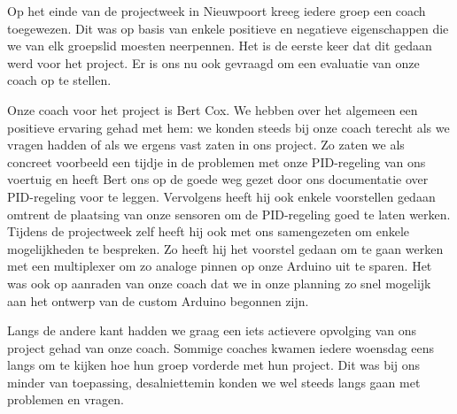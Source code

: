 Op het einde van de projectweek in Nieuwpoort kreeg iedere groep een coach toegewezen. Dit was op basis van enkele positieve en negatieve eigenschappen die we van elk groepslid moesten neerpennen. Het is de eerste keer dat dit gedaan werd voor het project. Er is ons nu ook gevraagd om een evaluatie van onze coach op te stellen.

Onze coach voor het project is Bert Cox. We hebben over het algemeen een positieve ervaring gehad met hem: we konden steeds bij onze coach terecht als we vragen hadden of als we ergens vast zaten in ons project. Zo zaten we als concreet voorbeeld een tijdje in de problemen met onze PID-regeling van ons voertuig en heeft Bert ons op de goede weg gezet door ons documentatie over PID-regeling voor te leggen. Vervolgens heeft hij ook enkele voorstellen gedaan omtrent de plaatsing van onze sensoren om de PID-regeling goed te laten werken. Tijdens de projectweek zelf heeft hij ook met ons samengezeten om enkele mogelijkheden te bespreken. Zo heeft hij het voorstel gedaan om te gaan werken met een multiplexer om zo analoge pinnen op onze Arduino uit te sparen. Het was ook op aanraden van onze coach dat we in onze planning zo snel mogelijk aan het ontwerp van de custom Arduino begonnen zijn. 

Langs de andere kant hadden we graag een iets actievere opvolging van ons project gehad van onze coach. Sommige coaches kwamen iedere woensdag eens langs om te kijken hoe hun groep vorderde met hun project. Dit was bij ons minder van toepassing, desalniettemin konden we wel steeds langs gaan met problemen en vragen. 